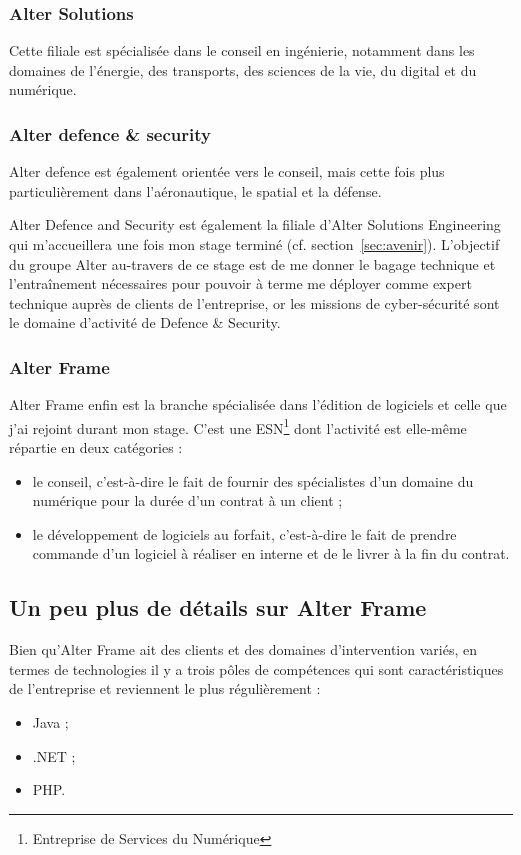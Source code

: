 \subsubsection{Alter Solutions}
Cette filiale est spécialisée dans le conseil en ingénierie, notamment dans les domaines de l'énergie, des transports, des sciences de la vie, du digital et du numérique.

\subsubsection{Alter defence \& security}
Alter defence est également orientée vers le conseil, mais cette fois plus particulièrement dans l'aéronautique, le spatial et la défense.

Alter Defence and Security est également la filiale d'Alter Solutions Engineering qui m'accueillera une fois mon stage terminé (cf. section~\ref{sec:avenir}). L'objectif du groupe Alter au-travers de ce stage est de me donner le bagage technique et l'entraînement nécessaires pour pouvoir à terme me déployer comme expert technique auprès de clients de l'entreprise, or les missions de cyber-sécurité sont le domaine d'activité de Defence \& Security.

\subsubsection{Alter Frame}
Alter Frame enfin est la branche spécialisée dans l'édition de logiciels et celle que j'ai rejoint durant mon stage. C'est une ESN\cite{esn_wiki}\footnote{Entreprise de Services du Numérique} dont l'activité est elle-même répartie en deux catégories :
\begin{itemize}
	\item le conseil, c'est-à-dire le fait de fournir des spécialistes d'un domaine du numérique pour la durée d'un contrat à un client ;
	\item le développement de logiciels au forfait, c'est-à-dire le fait de prendre commande d'un logiciel à réaliser en interne et de le livrer à la fin du contrat.
\end{itemize}

\subsection{Un peu plus de détails sur Alter Frame}
\label{subsec:frame}
Bien qu'Alter Frame ait des clients et des domaines d'intervention variés, en termes de technologies il y a trois pôles de compétences qui sont caractéristiques de l'entreprise et reviennent le plus régulièrement :
\begin{itemize}
	\item Java ;
	\item .NET ;
	\item PHP.
\end{itemize}

